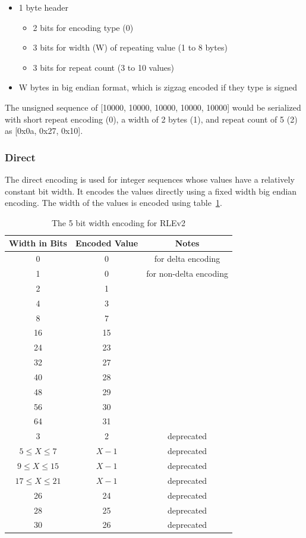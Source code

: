 \documentclass{article}
\begin{document}
\begin{itemize}
\item 1 byte header
  \begin{itemize}
  \item 2 bits for encoding type (0)
  \item 3 bits for width (W) of repeating value (1 to 8 bytes)
  \item 3 bits for repeat count (3 to 10 values)
  \end{itemize}
\item W bytes in big endian format, which is zigzag encoded if they type
  is signed
\end{itemize}

The unsigned sequence of [10000, 10000, 10000, 10000, 10000] would be
serialized with short repeat encoding (0), a width of 2 bytes (1), and
repeat count of 5 (2) as [0x0a, 0x27, 0x10].

\subsubsection{Direct}

The direct encoding is used for integer sequences whose values have a
relatively constant bit width. It encodes the values directly using a
fixed width big endian encoding.  The width of the values is encoded
using table~\ref{RleV2WidthTable}.

\begin{table}[htb]
  \begin{tabular}{| c | c | c |}
  \hline
  Width in Bits & Encoded Value & Notes\\
  \hline
  0 & 0 & for delta encoding \\
  1 & 0 & for non-delta encoding \\
  2 & 1 & \\
  4 & 3 & \\
  8 & 7 & \\
  16 & 15 & \\
  24 & 23 & \\
  32 & 27 & \\
  40 & 28 & \\
  48 & 29 & \\
  56 & 30 & \\
  64 & 31 & \\
  \hline
  3 & 2 & deprecated \\
  $5 \leq X \leq 7$ & $X - 1$ & deprecated \\
  $9 \leq X \leq 15$ & $X - 1$ & deprecated \\
  $17 \leq X \leq 21$ & $X - 1$ & deprecated \\
  26 & 24 & deprecated \\
  28 & 25 & deprecated \\
  30 & 26 & deprecated \\
  \hline
  \end{tabular}
  \caption{The 5 bit width encoding for RLEv2}
  \label{RleV2WidthTable}
\end{table}
\end{document}
